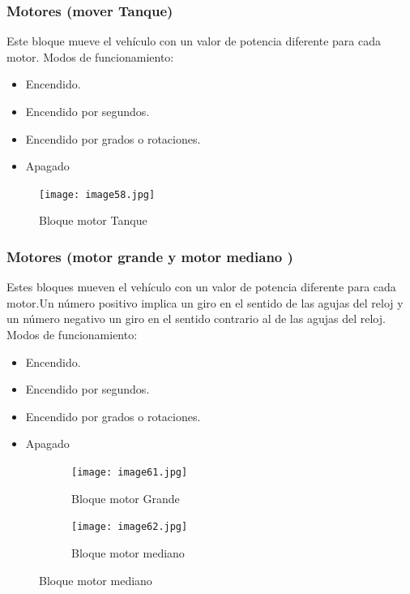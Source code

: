 \documentclass[12pt,a4paper]{article}
\begin{document}
\subsubsection{Motores (mover Tanque)}
Este bloque mueve el vehículo con un valor de potencia diferente para cada motor.
Modos de funcionamiento:
\begin{itemize}
\item Encendido.
\item Encendido por segundos.
\item Encendido por grados o rotaciones.
\item Apagado
\end{itemize}

\begin{figure}[H]
	\caption{Bloque motor Tanque}
	\texttt{[image: image58.jpg]}
	\centering
\end{figure}

\subsubsection{Motores (motor grande y motor mediano )}
Estes bloques mueven el vehículo con un valor de potencia diferente para cada motor.Un
número positivo implica un giro en el sentido de las agujas del reloj y un
número negativo un giro en el sentido contrario al de las agujas del reloj.
Modos de funcionamiento:
\begin{itemize}
\item Encendido.
\item Encendido por segundos.
\item Encendido por grados o rotaciones.
\item Apagado
\end{itemize}

\begin{figure}[H]
    \caption{Motores mediano y grande}
    \centering
  \begin{subfigure}{0.45\linewidth}
    \centering
	\caption{Bloque motor Grande}
	\texttt{[image: image61.jpg]}
  \end{subfigure} %
  \begin{subfigure}{0.45\linewidth}
    \centering
	\caption{Bloque motor mediano}
	\texttt{[image: image62.jpg]}
  \end{subfigure}
\end{figure}
\end{document}
